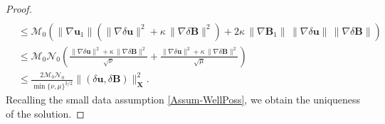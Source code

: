 \documentclass[3p]{elsarticle}
\def\V#1{\mathbf{#1}}
\def\VX{\mathbf{X}}
\newcommand{\Mbd}{\mathcal{M}}
\newcommand{\Nbd}{\mathcal{N}}
\begin{document}
\begin{proof}
\begin{align*}
\\ & \le 
\Mbd_0 \left(
 \|\nabla  \V{u}_1 \| \left( \|\nabla \delta \V{u} \|^2 + \kappa\,  \|\nabla \delta \V{B} \|^2 \right)
+ 2 \kappa\, \|\nabla  \V{B}_1 \| \, \|\nabla \delta \V{u} \|\, \|\nabla \delta \V{B} \|  \right) 
\\ & \le 
\Mbd_0 \Nbd_0 \left(  \frac{\|\nabla \delta \V{u} \|^2 + \kappa\,  \|\nabla \delta \V{B} \|^2}{\sqrt{\nu}} + \frac{\|\nabla \delta \V{u} \|^2 + \kappa\,  \|\nabla \delta \V{B} \|^2}{\sqrt{\mu}} \right) 
\\ & \le 
\frac{2\Mbd_0 \Nbd_0}{\min\{\nu,\mu\}^{3/2}} \|(\delta \V{u},\delta \V{B})\|^2_\VX .
\end{align*}
Recalling the small data assumption \eqref{Assum-WellPoss}, we obtain the uniqueness of the solution. 
\end{proof}
\end{document}
